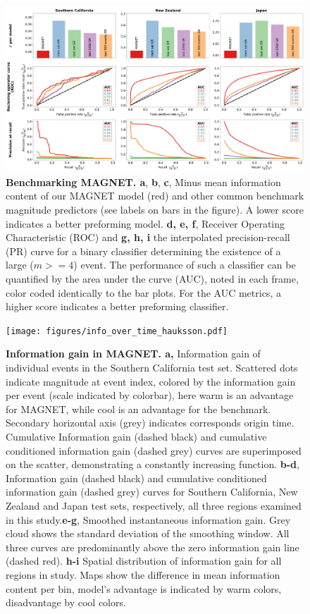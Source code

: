 \documentclass[pdflatex]{sn-jnl}
\begin{document}
\begin{figure}[h!]
    \centering
    \includegraphics[width=1\textwidth]{figures/combined_barplots.pdf}
    \caption{
        \textbf{Benchmarking MAGNET. a}, \textbf{b}, \textbf{c}, Minus mean information content of our MAGNET model (red) and other common benchmark magnitude predictors (see labels on bars in the figure). A lower score indicates a better preforming model. \textbf{d, e, f}, Receiver Operating Characteristic (ROC) and \textbf{g, h, i} the interpolated precision-recall (PR) curve for a binary classifier determining the existence of a large ($m>=4$) event. The performance of such a classifier can be quantified by the area under the curve (AUC), noted in each frame, color coded identically to the bar plots. For the AUC metrics, a higher score indicates a better preforming classifier.
        }
        \label{fig:metrics}
\end{figure}

   
    
\begin{figure}[h!]
    \centering
    \texttt{[image: figures/info\_over\_time\_hauksson.pdf]}
    \caption{
        \textbf{Information gain in MAGNET. a,} Information gain of individual events in the Southern California test set. Scattered dots indicate magnitude at event index, colored by the information gain per event (scale indicated by colorbar), here warm is an advantage for MAGNET, while cool is an advantage for the benchmark. Secondary horizontal axis (grey) indicates corresponds origin time. Cumulative Information gain (dashed black) and cumulative conditioned information gain (dashed grey) curves are superimposed on the scatter, demonstrating a constantly increasing function. \textbf{b-d}, Information gain (dashed black) and cumulative conditioned information gain (dashed grey) curves for Southern California, New Zealand and Japan test sets, respectively, all three regions examined in this study.\textbf{e-g}, Smoothed instantaneous information gain. Grey cloud shows the standard deviation of the smoothing window. All three curves are predominantly above the zero information gain line (dashed red). \textbf{h-i} Spatial distribution of information gain for all regions in study. Maps show the difference in mean information content per bin, model's advantage is indicated by warm colors, disadvantage by cool colors.
    }
    \label{fig:info_gain_over_time}
\end{figure}
    
\end{document}
